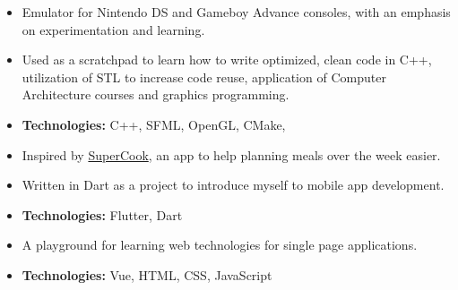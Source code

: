 \documentclass[10pt,letterpaper,ragged2e,academicons]{altacv}
\begin{document}

\begin{fullwidth}
  \makecvheader
\end{fullwidth}




\begin{itemize}
  \item Emulator for Nintendo DS and Gameboy Advance consoles, with an emphasis on experimentation and learning.
  \item Used as a scratchpad to learn how to write optimized, clean code in C++, utilization of STL to increase code reuse, application of Computer Architecture courses and graphics programming.
  \item \textbf{Technologies:} C++, SFML, OpenGL, CMake,
\end{itemize}
\divider\small

\begin{itemize}
  \item Inspired by \href{www.supercook.com}{SuperCook}, an app to help planning meals over the week easier.
  \item Written in Dart as a project to introduce myself to mobile app development.
  \item \textbf{Technologies:} Flutter, Dart
\end{itemize}
\divider\small

\begin{itemize}
  \item A playground for learning web technologies for single page applications.
  \item \textbf{Technologies:} Vue, HTML, CSS, JavaScript
\end{itemize}
\divider\small
\end{document}
